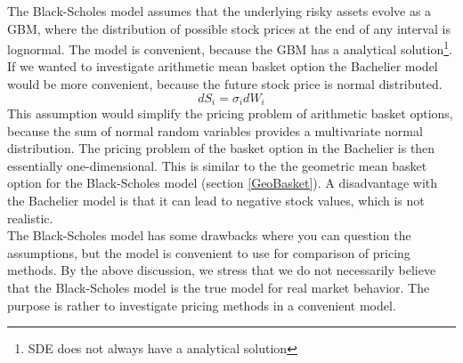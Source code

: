 The Black-Scholes model assumes that the underlying risky assets evolve as a GBM, where the distribution of possible stock prices at the end of any interval is lognormal. The model is convenient, because the GBM has a analytical solution\footnote{SDE does not always have a analytical solution}. If we wanted to investigate arithmetic mean basket option the Bachelier model would be more convenient, because the future stock price is normal distributed. 
\begin{equation*}
dS_i=\sigma_i dW_i
\end{equation*}
This assumption would simplify the pricing problem of arithmetic basket options, because the sum of normal random variables provides a multivariate normal distribution. The pricing problem of the basket option in the Bachelier is then essentially one-dimensional. This is similar to the the geometric mean basket option for the Black-Scholes model (section \ref{GeoBasket}). A disadvantage with the Bachelier model is that it can lead to negative stock values, which is not realistic.\\

The Black-Scholes model has some drawbacks where you can question the assumptions, but the model is convenient to use for comparison of pricing methods. By the above discussion, we stress that we do not necessarily believe that the Black-Scholes model is the true model for real market behavior. The purpose is rather to investigate pricing methods in a convenient model.

